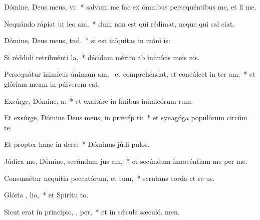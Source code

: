 \item Dómine, Deus meus,   vi:~* salvum me fac ex ómnibus persequéntibus me, et lí me.
\item Nequándo rápiat ut leo  am,~* dum non est qui rédimat, neque qui sal ciat.
\item Dómine, Deus meus,   tud.~* si est iníquitas in máni is:
\item Si réddidi retribuénti  la,~* décidam mérito ab inimícis meis nis.
\item Persequátur inimícus ánimam am,~\pscross{} et comprehéndat, et concúlcet in ter  am,~* et glóriam meam in púlverem cat.
\item Exsúrge, Dómine,   a:~* et exaltáre in fínibus inimicórum rum.
\item Et exsúrge, Dómine Deus meus, in præcép  ti:~* et synagóga populórum circúm te.
\item Et propter hanc in  dere:~* Dóminus júdi pulos.
\item Júdica me, Dómine, secúndum jus am,~* et secúndum innocéntiam me per me.
\item Consumétur nequítia peccatórum, et  tum,~* scrutans corda et re us.
\item Glória ,  lio,~* et Spirítu to.
\item Sicut erat in princípio,  ,  per,~* et in sǽcula sæculó. men.
